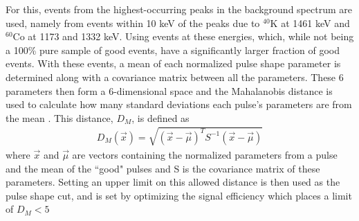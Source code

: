 For this, events from the highest-occurring peaks in the background spectrum are used, namely from events within 10 keV of the peaks due to $^{40}$K at 1461 keV and $^{60}$Co at 1173 and 1332 keV.
Using events at these energies, which, while not being a 100\% pure sample of good events, have a significantly larger fraction of good events.
With these events, a mean of each normalized pulse shape parameter is determined along with a covariance matrix between all the parameters.
These 6 parameters then form a 6-dimensional space and the Mahalanobis distance is used to calculate how many standard deviations each pulse's parameters are from the mean \cite{mahalanobis1936generalized}.
This distance, $D_M$, is defined as
\begin{align}
    D_M(\Vec{x}) = \sqrt{(\Vec{x}-\Vec{\mu})^TS^{-1}(\Vec{x}-\Vec{\mu})}
\end{align}
where $\Vec{x}$ and $\Vec{\mu}$ are vectors containing the normalized parameters from a pulse and the mean of the ``good" pulses and S is the covariance matrix of these parameters.
Setting an upper limit on this allowed distance is then used as the pulse shape cut, and is set by optimizing the signal efficiency which places a limit of $D_M<5$

